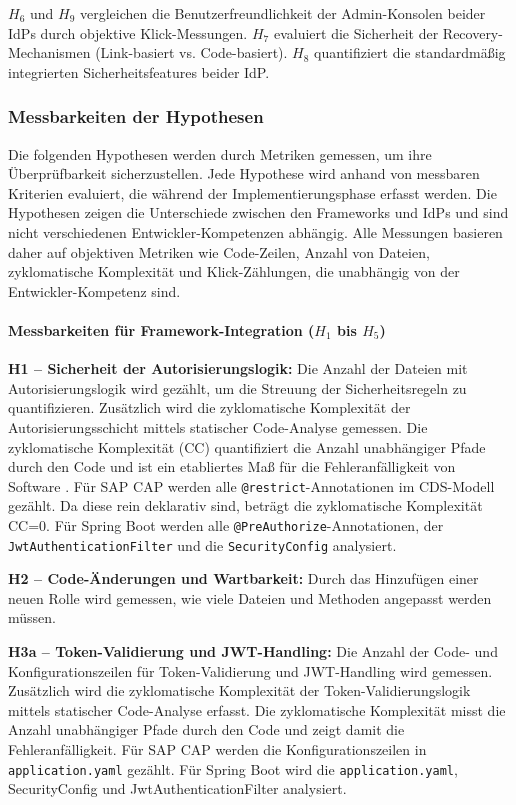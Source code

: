 $H_6$ und $H_9$ vergleichen die Benutzerfreundlichkeit der Admin-Konsolen beider \ac{IdP}s durch objektive Klick-Messungen. $H_7$ evaluiert die Sicherheit der Recovery-Mechanismen (Link-basiert vs. Code-basiert). $H_8$ quantifiziert die standardmäßig integrierten Sicherheitsfeatures beider \ac{IdP}.

\subsubsection{Messbarkeiten der Hypothesen}

Die folgenden Hypothesen werden durch Metriken gemessen,
um ihre Überprüfbarkeit sicherzustellen. Jede Hypothese wird anhand von messbaren Kriterien evaluiert, die während der Implementierungsphase erfasst werden.
Die Hypothesen zeigen die Unterschiede zwischen den
Frameworks und \ac{IdP}s und sind nicht verschiedenen Entwickler-Kompetenzen abhängig. Alle Messungen basieren daher auf objektiven Metriken wie Code-Zeilen,
Anzahl von Dateien, zyklomatische Komplexität und Klick-Zählungen, die unabhängig von der Entwickler-Kompetenz sind.

\paragraph{Messbarkeiten für Framework-Integration ($H_1$ bis $H_5$)}

\textbf{H1 – Sicherheit der Autorisierungslogik:} Die Anzahl der Dateien mit Autorisierungslogik wird gezählt, um die Streuung der Sicherheitsregeln zu quantifizieren. Zusätzlich wird die zyklomatische Komplexität der Autorisierungsschicht mittels statischer Code-Analyse gemessen. Die zyklomatische Komplexität (CC) quantifiziert die Anzahl unabhängiger Pfade durch den Code und ist ein etabliertes Maß für die Fehleranfälligkeit von Software \citep{McCabe1976}.
Für \ac{SAP CAP} werden alle \texttt{@restrict}-Annotationen im \ac{CDS}-Modell gezählt.
Da diese rein deklarativ sind, beträgt die zyklomatische Komplexität CC=0.
Für Spring Boot werden alle \texttt{@PreAuthorize}-Annotationen, der \texttt{JwtAuthenticationFilter} und die \texttt{SecurityConfig} analysiert.

\textbf{H2 – Code-Änderungen und Wartbarkeit:} Durch das Hinzufügen einer neuen
Rolle wird gemessen, wie viele Dateien und Methoden angepasst werden müssen.

\textbf{H3a – Token-Validierung und JWT-Handling:} Die Anzahl der Code- und Konfigurationszeilen
für Token-Validierung und \ac{JWT}-Handling wird gemessen. Zusätzlich wird die zyklomatische Komplexität der Token-Validierungslogik mittels statischer Code-Analyse erfasst. Die zyklomatische Komplexität misst die Anzahl unabhängiger Pfade durch den Code und zeigt damit die Fehleranfälligkeit. Für \ac{SAP CAP} werden die Konfigurationszeilen in \texttt{application.yaml} gezählt. Für Spring Boot wird die \texttt{application.yaml}, SecurityConfig und JwtAuthenticationFilter analysiert.

